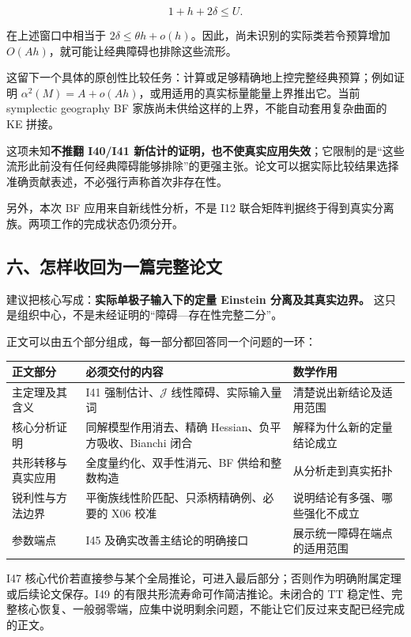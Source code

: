 \documentclass[
  10pt,
]{article}
\begin{document}
\[
1+h+2\delta\le U.
\]

在上述窗口中相当于
\(2\delta\le\theta h+o(h)\)。因此，尚未识别的实际类若令预算增加
\(O(Ah)\)，就可能让经典障碍也排除这些流形。

这留下一个具体的原创性比较任务：计算或足够精确地上控完整经典预算；例如证明
\(\alpha^2(M)=A+o(Ah)\)，或用适用的真实标量能量上界推出它。当前
symplectic geography BF 家族尚未供给这样的上界，不能自动套用复杂曲面的
KE 拼接。

这项未知\textbf{不推翻 I40/I41
新估计的证明，也不使真实应用失效}；它限制的是``这些流形此前没有任何经典障碍能够排除''的更强主张。论文可以据实际比较结果选择准确贡献表述，不必强行声称首次非存在性。

另外，本次 BF 应用来自新线性分析，不是 I12
联合矩阵判据终于得到真实分离族。两项工作的完成状态仍须分开。

\hypertarget{ux516dux600eux6837ux6536ux56deux4e3aux4e00ux7bc7ux5b8cux6574ux8bbaux6587}{%
\subsection{六、怎样收回为一篇完整论文}\label{ux516dux600eux6837ux6536ux56deux4e3aux4e00ux7bc7ux5b8cux6574ux8bbaux6587}}

建议把核心写成：\textbf{实际单极子输入下的定量 Einstein
分离及其真实边界。}
这只是组织中心，不是未经证明的``障碍---存在性完整二分''。

正文可以由五个部分组成，每一部分都回答同一个问题的一环：

\begin{longtable}[]{@{}>{\raggedright\arraybackslash}p{\dimexpr(\linewidth-4\tabcolsep)/3\relax}>{\raggedright\arraybackslash}p{\dimexpr(\linewidth-4\tabcolsep)/3\relax}>{\raggedright\arraybackslash}p{\dimexpr(\linewidth-4\tabcolsep)/3\relax}@{}}
\toprule
正文部分 & 必须交付的内容 & 数学作用\tabularnewline
\midrule
\endhead
主定理及其含义 & I41 强制估计、\(\mathcal J\) 线性障碍、实际输入量词 &
清楚说出新结论及适用范围\tabularnewline
核心分析证明 & 同解模型作用消去、精确 Hessian、负平方吸收、Bianchi 闭合
& 解释为什么新的定量结论成立\tabularnewline
共形转移与真实应用 & 全度量约化、双手性消元、BF 供给和整数构造 &
从分析走到真实拓扑\tabularnewline
锐利性与方法边界 & 平衡族线性阶匹配、只添柄精确例、必要的 X06 校准 &
说明结论有多强、哪些强化不成立\tabularnewline
参数端点 & I45 及确实改善主结论的明确接口 &
展示统一障碍在端点的适用范围\tabularnewline
\bottomrule
\end{longtable}

I47
核心代价若直接参与某个全局推论，可进入最后部分；否则作为明确附属定理或后续论文保存。I49
的有限共形流寿命可作简洁推论。未闭合的 TT
稳定性、完整核心恢复、一般弱零端，应集中说明剩余问题，不能让它们反过来支配已经完成的正文。
\end{document}
